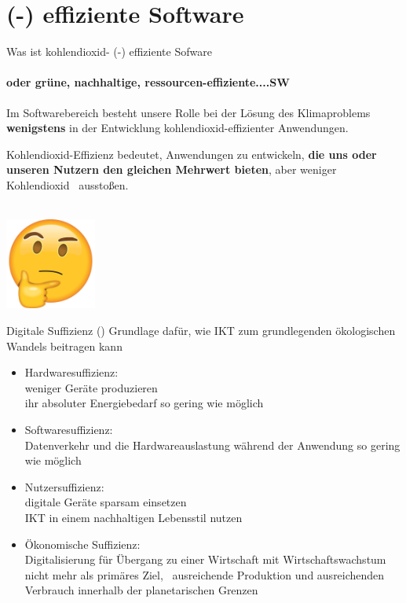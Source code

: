 \section{(\COz-) effiziente Software}

\begin{frame}{Was ist kohlendioxid- (\COz-) effiziente Sofware}
	\framesubtitle{\hspace*{\fill}oder grüne, nachhaltige, ressourcen-effiziente....SW}
	\begin{block}{}
	Im Softwarebereich besteht unsere Rolle bei der Lösung des Klimaproblems \textbf<2->{wenigstens} 
	in der Entwicklung kohlendioxid-effizienter Anwendungen. 
	
	Kohlendioxid-Effizienz bedeutet, Anwendungen zu entwickeln,\textbf<2->{ die uns oder unseren  
	Nutzern den gleichen Mehrwert bieten}, aber weniger Kohlendioxid \COz \ ausstoßen.
	\end{block}\pause 
	~\\[-10mm]\hspace*{\fill}
	\href{https://www.freepngimg.com/png/77530-emoticon-thinking-thought-world-whatsapp-day-emoji}{%
	\includegraphics[width=3cm]{../Figures/emoji-thought.png}}
\end{frame}

\begin{frame}{Digitale Suffizienz (\cite{santarius_digital_2023})} 
Grundlage dafür,  wie IKT zum  grundlegenden ökologischen Wandels beitragen kann 
\begin{itemize}
	\item Hardwaresuffizienz: \\
	   weniger Geräte produzieren \\
		ihr absoluter Energiebedarf so gering wie möglich
  \item  Softwaresuffizienz:\\
	   Datenverkehr und die Hardwareauslastung während der Anwendung so gering wie möglich
 \item Nutzersuffizienz:\\
      digitale Geräte sparsam einsetzen \\
			IKT in einem nachhaltigen Lebensstil nutzen
\item Ökonomische Suffizienz:\\
    Digitalisierung für  Übergang zu einer Wirtschaft mit
		Wirtschaftswachstum nicht mehr als primäres Ziel, \
		ausreichende Produktion und ausreichenden Verbrauch innerhalb der planetarischen Grenzen
\end{itemize}

\end{frame}

